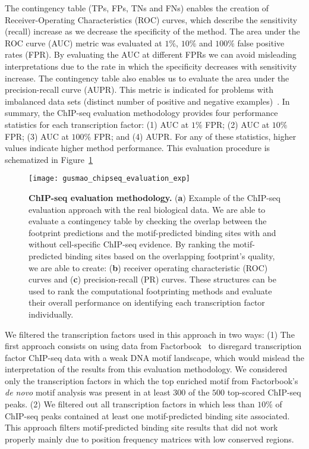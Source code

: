 The contingency table (TPs, FPs, TNs and FNs) enables the creation of Receiver-Operating Characteristics (ROC) curves, which describe the sensitivity (recall) increase as we decrease the specificity of the method. The area under the ROC curve (AUC) metric was evaluated at $1\%$, $10\%$ and $100\%$ false positive rates (FPR). By evaluating the AUC at different FPRs we can avoid misleading interpretations due to the rate in which the specificity decreases with sensitivity increase. The contingency table also enables us to evaluate the area under the precision-recall curve (AUPR). This metric is indicated for problems with imbalanced data sets (distinct number of positive and negative examples)~\cite{davis2006,fawcett2006}. In summary, the ChIP-seq evaluation methodology provides four performance statistics for each transcription factor: (1) AUC at $1\%$ FPR; (2) AUC at $10\%$ FPR; (3) AUC at $100\%$ FPR; and (4) AUPR. For any of these statistics, higher values indicate higher method performance. This evaluation procedure is schematized in Figure~\ref{fig:gusmao_chipseq_evaluation_exp}

\begin{figure}[h!]
\centering
\texttt{[image: gusmao\_chipseq\_evaluation\_exp]}
\caption[ChIP-seq evaluation methodology]{\textbf{ChIP-seq evaluation methodology.} (\textbf{a}) Example of the ChIP-seq evaluation approach with the real biological data. We are able to evaluate a contingency table by checking the overlap between the footprint predictions and the motif-predicted binding sites with and without cell-specific ChIP-seq evidence. By ranking the motif-predicted binding sites based on the overlapping footprint's quality, we are able to create: (\textbf{b}) receiver operating characteristic (ROC) curves and (\textbf{c}) precision-recall (PR) curves. These structures can be used to rank the computational footprinting methods and evaluate their overall performance on identifying each transcription factor individually.}
\label{fig:gusmao_chipseq_evaluation_exp}
\end{figure}

We filtered the transcription factors used in this approach in two ways: (1) The first approach consists on using data from Factorbook~\cite{wang2013} to disregard transcription factor ChIP-seq data with a weak DNA motif landscape, which would mislead the interpretation of the results from this evaluation methodology. We considered only the transcription factors in which the top enriched motif from Factorbook's \emph{de novo} motif analysis was present in at least $300$ of the $500$ top-scored ChIP-seq peaks. (2) We filtered out all transcription factors in which less than $10\%$ of ChIP-seq peaks contained at least one motif-predicted binding site associated. This approach filters motif-predicted binding site results that did not work properly mainly due to position frequency matrices with low conserved regions.

